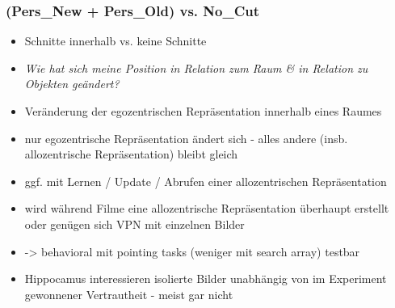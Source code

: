 \documentclass[10pt,a4paper,twocolumn]{article}
\begin{document}
\subsubsection*{(Pers\_New + Pers\_Old) vs. No\_Cut }
\begin{itemize}
	\item Schnitte innerhalb vs. keine Schnitte
	\item \emph{Wie hat sich meine Position in Relation zum Raum \& in Relation
		zu Objekten geändert? }
	\item Veränderung der egozentrischen Repräsentation innerhalb eines Raumes 
	\item nur egozentrische Repräsentation ändert sich - alles andere (insb.
	allozentrische Repräsentation) bleibt gleich 
	\item ggf. mit Lernen / Update / Abrufen einer allozentrischen Repräsentation 
	\item wird während Filme eine allozentrische Repräsentation überhaupt erstellt
	oder genügen sich VPN mit einzelnen Bilder \citep{levin_2010_spatial_representations_familiar_TV} 
	\item -> behavioral mit pointing tasks (weniger mit search array) testbar
	\item Hippocamus interessieren isolierte Bilder \textendash{} unabhängig
	von im Experiment gewonnener Vertrautheit - meist gar nicht
\end{itemize}
\end{document}
